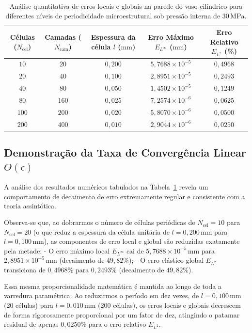 \begin{table}[htbp]
  \centering
  \caption{Análise quantitativa de erros locais e globais na parede do vaso cilíndrico para diferentes níveis de periodicidade microestrutural sob pressão interna de $30 \, \text{MPa}$.}
  \label{tab:convergencia_erros}
  \begin{tabular}{c c c c c}
    \hline
    \textbf{Células ($N_{\text{cel}}$)} & \textbf{Camadas ($N_{\text{cam}}$)} & \textbf{Espessura da célula $l$ ($\text{mm}$)} & \textbf{Erro Máximo $E_{L^\infty}$ ($\text{mm}$)} & \textbf{Erro Relativo $E_{L^2}$ (\%)} \\ \hline
    $10$ & $20$ & $0,200$ & $5,7688 \times 10^{-5}$ & $0,4968$ \\ \hline
    $20$ & $40$ & $0,100$ & $2,8951 \times 10^{-5}$ & $0,2493$ \\ \hline
    $40$ & $80$ & $0,050$ & $1,4502 \times 10^{-5}$ & $0,1249$ \\ \hline
    $80$ & $160$ & $0,025$ & $7,2574 \times 10^{-6}$ & $0,0625$ \\ \hline
    $100$ & $200$ & $0,020$ & $5,8070 \times 10^{-6}$ & $0,0500$ \\ \hline
    $200$ & $400$ & $0,010$ & $2,9044 \times 10^{-6}$ & $0,0250$ \\ \hline
  \end{tabular}
\end{table}

\subsection{Demonstração da Taxa de Convergência Linear $O(\epsilon)$}

A análise dos resultados numéricos tabulados na Tabela~\ref{tab:convergencia_erros} revela um comportamento de decaimento de erro extremamente regular e consistente com a teoria assintótica.

Observa-se que, ao dobrarmos o número de células periódicas de $N_{\text{cel}} = 10$ para $N_{\text{cel}} = 20$ (o que reduz a espessura da célula unitária de $l = 0,200 \, \text{mm}$ para $l = 0,100 \, \text{mm}$), as componentes de erro local e global são reduzidas exatamente pela metade:
- O erro máximo local $E_{L^\infty}$ cai de $5,7688 \times 10^{-5} \, \text{mm}$ para $2,8951 \times 10^{-5} \, \text{mm}$ (decaimento de $49,82\%$);
- O erro elástico global $E_{L^2}$ transiciona de $0,4968\%$ para $0,2493\%$ (decaimento de $49,82\%$).

Essa mesma proporcionalidade matemática é mantida ao longo de toda a varredura paramétrica. Ao reduzirmos o período em dez vezes, de $l = 0,100 \, \text{mm}$ (20 células) para $l = 0,010 \, \text{mm}$ (200 células), os erros locais e globais decrescem de forma rigorosamente proporcional por um fator de dez, atingindo o patamar residual de apenas \textbf{$0,0250\%$} para o erro relativo $E_{L^2}$.

